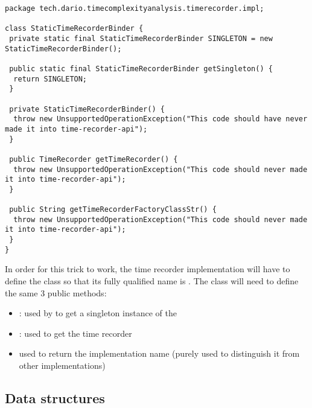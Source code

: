 \noindent\begin{minipage}[c]{\linewidth}
\begin{lstlisting}[breaklines,caption={StaticTimeRecorderBinder dummy implementation},label=lis:timerecorderapi:statictimerecorderbinderdummy]
package tech.dario.timecomplexityanalysis.timerecorder.impl;

class StaticTimeRecorderBinder {
 private static final StaticTimeRecorderBinder SINGLETON = new StaticTimeRecorderBinder();

 public static final StaticTimeRecorderBinder getSingleton() {
  return SINGLETON;
 }

 private StaticTimeRecorderBinder() {
  throw new UnsupportedOperationException("This code should have never made it into time-recorder-api");
 }

 public TimeRecorder getTimeRecorder() {
  throw new UnsupportedOperationException("This code should never made it into time-recorder-api");
 }

 public String getTimeRecorderFactoryClassStr() {
  throw new UnsupportedOperationException("This code should never made it into time-recorder-api");
 }
}
\end{lstlisting}
\end{minipage}

\noindent In order for this trick to work, the time recorder implementation will have to define the class so that its fully qualified name is . The class will need to define the same 3 public methods:

\begin{itemize}
  \item \textbf{  }: used by  to get a singleton instance of the 
  \item \textbf{ }: used to get the time recorder
  \item \textbf{ } used to return the implementation name (purely used to distinguish it from other implementations)
\end{itemize}

\subsection{Data structures}
\label{sec:implementation:timerecorderapi:datastructures}

